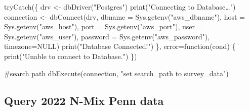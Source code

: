 \documentclass[
  letterpaper,
  DIV=11,
  numbers=noendperiod]{scrartcl}
\newenvironment{Shaded}{\begin{snugshade}}{\end{snugshade}}
\newcommand{\AttributeTok}[1]{\textcolor[rgb]{0.40,0.45,0.13}{#1}}
\newcommand{\CommentTok}[1]{\textcolor[rgb]{0.37,0.37,0.37}{#1}}
\newcommand{\ConstantTok}[1]{\textcolor[rgb]{0.56,0.35,0.01}{#1}}
\newcommand{\ControlFlowTok}[1]{\textcolor[rgb]{0.00,0.23,0.31}{#1}}
\newcommand{\FunctionTok}[1]{\textcolor[rgb]{0.28,0.35,0.67}{#1}}
\newcommand{\NormalTok}[1]{\textcolor[rgb]{0.00,0.23,0.31}{#1}}
\newcommand{\OtherTok}[1]{\textcolor[rgb]{0.00,0.23,0.31}{#1}}
\newcommand{\StringTok}[1]{\textcolor[rgb]{0.13,0.47,0.30}{#1}}
\begin{document}
\begin{Shaded}
\begin{Highlighting}[]
\FunctionTok{tryCatch}\NormalTok{(\{}
\NormalTok{    drv }\OtherTok{\textless{}{-}} \FunctionTok{dbDriver}\NormalTok{(}\StringTok{"Postgres"}\NormalTok{)}
    \FunctionTok{print}\NormalTok{(}\StringTok{"Connecting to Database…"}\NormalTok{)}
\NormalTok{    connection }\OtherTok{\textless{}{-}} \FunctionTok{dbConnect}\NormalTok{(drv,}
                 \AttributeTok{dbname =} \FunctionTok{Sys.getenv}\NormalTok{(}\StringTok{"aws\_dbname"}\NormalTok{),}
                 \AttributeTok{host =} \FunctionTok{Sys.getenv}\NormalTok{(}\StringTok{"aws\_host"}\NormalTok{),}
                 \AttributeTok{port =} \FunctionTok{Sys.getenv}\NormalTok{(}\StringTok{"aws\_port"}\NormalTok{),}
                 \AttributeTok{user =} \FunctionTok{Sys.getenv}\NormalTok{(}\StringTok{"aws\_user"}\NormalTok{),}
                 \AttributeTok{password =} \FunctionTok{Sys.getenv}\NormalTok{(}\StringTok{"aws\_password"}\NormalTok{),}
                 \AttributeTok{timezone=}\ConstantTok{NULL}\NormalTok{)}
    \FunctionTok{print}\NormalTok{(}\StringTok{"Database Connected!"}\NormalTok{)}
\NormalTok{    \},}
    \AttributeTok{error=}\ControlFlowTok{function}\NormalTok{(cond) \{}
            \FunctionTok{print}\NormalTok{(}\StringTok{"Unable to connect to Database."}\NormalTok{)}
\NormalTok{    \})}

\CommentTok{\#search path}
\FunctionTok{dbExecute}\NormalTok{(connection, }\StringTok{"set search\_path to survey\_data"}\NormalTok{)}
\end{Highlighting}
\end{Shaded}

\hypertarget{query-2022-n-mix-penn-data}{%
\subsection{Query 2022 N-Mix Penn
data}\label{query-2022-n-mix-penn-data}}
\end{document}
